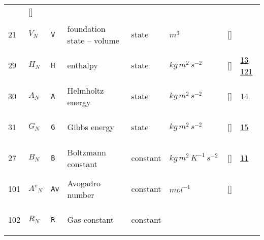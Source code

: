 \begin{longtable}{|p{1cm}|p{3cm}|p{3cm}|p{7cm}|p{3.0cm}|p{3cm}|p{2cm}|p{1cm}|}
             & []
             & \\
    21
             & \hypertarget{"v:21"}{ $ {V}_{N} $}
             & \verb|V|
             & foundation state – volume
             & \begin{lay}state \end{lay}
             & $ m^{3} \, $
             & []
             & \\
    29
             & \hypertarget{"v:29"}{ $ {H}_{N} $}
             & \verb|H|
             & enthalpy
             & \begin{lay}state \end{lay}
             & $ kg \,m^{2} \,s^{-2} \, $
             & []
             & \hyperlink{"e:13"}{ 13 }
                 \hyperlink{"e:121"}{ 121 }
                 \\
    30
             & \hypertarget{"v:30"}{ $ {A}_{N} $}
             & \verb|A|
             & Helmholtz energy
             & \begin{lay}state \end{lay}
             & $ kg \,m^{2} \,s^{-2} \, $
             & []
             & \hyperlink{"e:14"}{ 14 }
                 \\
    31
             & \hypertarget{"v:31"}{ $ {G}_{N} $}
             & \verb|G|
             & Gibbs energy
             & \begin{lay}state \end{lay}
             & $ kg \,m^{2} \,s^{-2} \, $
             & []
             & \hyperlink{"e:15"}{ 15 }
                 \\
    27
             & \hypertarget{"v:27"}{ $ {B}_{N} $}
             & \verb|B|
             & Boltzmann constant
             & \begin{lay}constant \end{lay}
             & $ kg \,m^{2} \,K^{-1} \,s^{-2} \, $
             & []
             & \hyperlink{"e:11"}{ 11 }
                 \\
    101
             & \hypertarget{"v:101"}{ $ {A^{v}}_{N} $}
             & \verb|Av|
             & Avogadro number
             & \begin{lay}constant \end{lay}
             & $ mol^{-1} \, $
             & []
             & \\
    102
             & \hypertarget{"v:102"}{ $ {R}_{N} $}
             & \verb|R|
             & Gas constant
             & \begin{lay}constant \end{lay}

\end{longtable}
